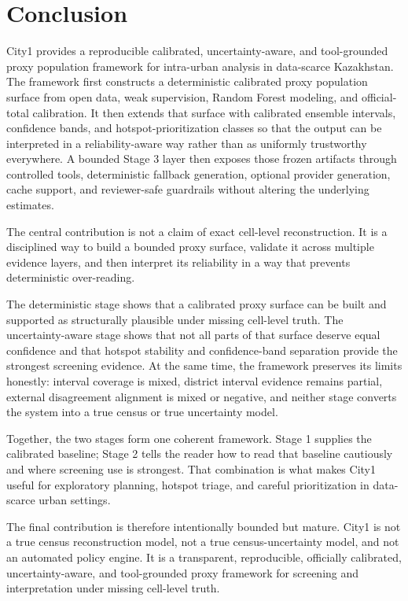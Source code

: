 \section{Conclusion}

City1 provides a reproducible calibrated, uncertainty-aware, and tool-grounded proxy population framework for intra-urban analysis in data-scarce Kazakhstan. The framework first constructs a deterministic calibrated proxy population surface from open data, weak supervision, Random Forest modeling, and official-total calibration. It then extends that surface with calibrated ensemble intervals, confidence bands, and hotspot-prioritization classes so that the output can be interpreted in a reliability-aware way rather than as uniformly trustworthy everywhere. A bounded Stage 3 layer then exposes those frozen artifacts through controlled tools, deterministic fallback generation, optional provider generation, cache support, and reviewer-safe guardrails without altering the underlying estimates.

The central contribution is not a claim of exact cell-level reconstruction. It is a disciplined way to build a bounded proxy surface, validate it across multiple evidence layers, and then interpret its reliability in a way that prevents deterministic over-reading.

The deterministic stage shows that a calibrated proxy surface can be built and supported as structurally plausible under missing cell-level truth. The uncertainty-aware stage shows that not all parts of that surface deserve equal confidence and that hotspot stability and confidence-band separation provide the strongest screening evidence. At the same time, the framework preserves its limits honestly: interval coverage is mixed, district interval evidence remains partial, external disagreement alignment is mixed or negative, and neither stage converts the system into a true census or true uncertainty model.

Together, the two stages form one coherent framework. Stage 1 supplies the calibrated baseline; Stage 2 tells the reader how to read that baseline cautiously and where screening use is strongest. That combination is what makes City1 useful for exploratory planning, hotspot triage, and careful prioritization in data-scarce urban settings.

The final contribution is therefore intentionally bounded but mature. City1 is not a true census reconstruction model, not a true census-uncertainty model, and not an automated policy engine. It is a transparent, reproducible, officially calibrated, uncertainty-aware, and tool-grounded proxy framework for screening and interpretation under missing cell-level truth.

